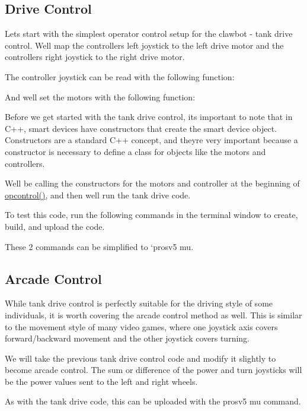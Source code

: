 \subsection*{Drive Control}

Let\textquotesingle{}s start with the simplest operator control setup for the clawbot -\/ tank drive control. We\textquotesingle{}ll map the controller\textquotesingle{}s left joystick to the left drive motor and the controller\textquotesingle{}s right joystick to the right drive motor.

The controller joystick can be read with the following function\+:

And we\textquotesingle{}ll set the motors with the following function\+:

Before we get started with the tank drive control, it\textquotesingle{}s important to note that in C++, smart devices have constructors that create the smart device object. Constructors are a standard C++ concept, and they\textquotesingle{}re very important because a constructor is necessary to define a class for objects like the motors and controllers.

We\textquotesingle{}ll be calling the constructors for the motors and controller at the beginning of {\ttfamily \hyperlink{main_8h_a1903abdb5ef0f301d660754c8315fc17}{opcontrol()}}, and then we\textquotesingle{}ll run the tank drive code.

To test this code, run the following commands in the terminal window to create, build, and upload the code.

These 2 commands can be simplified to {\ttfamily `prosv5 mu}.

\subsection*{Arcade Control}

While tank drive control is perfectly suitable for the driving style of some individuals, it is worth covering the arcade control method as well. This is similar to the movement style of many video games, where one joystick axis covers forward/backward movement and the other joystick covers turning.

We will take the previous tank drive control code and modify it slightly to become arcade control. The sum or difference of the power and turn joysticks will be the power values sent to the left and right wheels.

As with the tank drive code, this can be uploaded with the {\ttfamily prosv5 mu} command.

